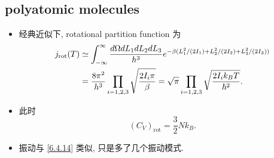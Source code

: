 \subsection{polyatomic molecules}
\begin{itemize}
	\item 经典近似下, rotational partition function 为
	\begin{align}
		j_\text{rot}(T) &\simeq \int_{- \infty}^\infty \frac{d\Omega dL_1 dL_2 dL_3}{h^3} e^{- \beta (L_1^2 / (2 I_1) + L_2^2 / (2 I_2) + L_3^2 / (2 I_3))} \notag \\
		&= \frac{8 \pi^2}{h^3} \prod_{i = 1, 2, 3} \sqrt{\frac{2 I_i \pi}{\beta}} = \sqrt{\pi} \prod_{i = 1, 2, 3} \sqrt{\frac{2 I_i k_B T}{\hbar^2}}.
	\end{align}
	
	\item 此时
	\begin{equation}
		(C_V)_\text{rot} = \frac{3}{2} N k_B.
	\end{equation}
	
	\item 振动与 \eqref{6.4.14} 类似, 只是多了几个振动模式.
\end{itemize}

